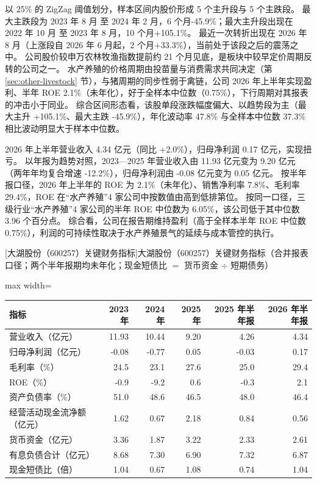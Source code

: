  以 25\% 的 ZigZag 阈值划分，样本区间内股价形成 5 个主升段与 5 个主跌段。 最大主跌段为 2023 年 8 月 至 2024 年 2 月，6 个月-45.9\%；最大主升段出现在 2022 年 10 月 至 2023 年 8 月，10 个月+105.1\%。 最近一次转折出现在 2026 年 8 月（上涨段自 2026 年 6 月起，2 个月+33.3\%），当前处于该段之后的震荡之中。 公司股价较申万农林牧渔指数提前约 21 个月见底，是板块中较早定价周期反转的公司之一。 水产养殖的价格周期由投苗量与消费需求共同决定（第 \ref{sec:other-livestock} 节），与猪周期的同步性弱于禽链，公司 2026 年上半年实现盈利、半年 ROE 2.1\%（未年化），好于全样本中位数（0.75\%），下行周期对其报表的冲击小于同业。 综合区间形态看，该股单段涨跌幅度偏大、以趋势段为主（最大主升 +105.1\%、最大主跌 -45.9\%），年化波动率 47.8\% 与全样本中位数 37.3\% 相比波动明显大于样本中位数。

 2026 年上半年营业收入 4.34 亿元（同比 +2.0\%），归母净利润 0.17 亿元，实现扭亏。 以年报为趋势对照，2023---2025 年营业收入由 11.93 亿元变为 9.20 亿元（两年年均复合增速 -12.2\%），归母净利润由 -0.08 亿元变为 0.05 亿元。 按半年报口径，2026 年上半年的 ROE 为 2.1\%（未年化）、销售净利率 7.8\%、毛利率 29.4\%，ROE 在“水产养殖”4 家公司中按数值由高到低排第位。 按同一口径，三级行业“水产养殖”4 家公司的半年 ROE 中位数为 6.05\%，该公司低于其中位数 3.96 个百分点。 综合看，公司在报告期维持盈利（高于全样本半年 ROE 中位数 0.75\%），利润的可持续性取决于水产养殖景气的延续与成本管控的执行。

\begin{center}\small\setlength{\tabcolsep}{3.4pt}
[大湖股份（600257）关键财务指标]{大湖股份（600257）关键财务指标（合并报表口径；两个半年报期均未年化；现金短债比 $=$ 货币资金 $\div$ 短期债务）}
\begin{adjustbox}{max width=\textwidth}
\begin{tabular}{@{}lrrrrr@{}}
\toprule
指标 & 2023 年 & 2024 年 & 2025 年 & 2025 年半年报 & 2026 年半年报 \\
\midrule
营业收入（亿元） & 11.93 & 10.44 & 9.20 & 4.26 & 4.34 \\
归母净利润（亿元） & -0.08 & -0.77 & 0.05 & -0.03 & 0.17 \\
毛利率（\%） & 24.5 & 23.1 & 27.6 & 25.0 & 29.4 \\
ROE（\%） & -0.9 & -9.2 & 0.6 & -0.3 & 2.1 \\
资产负债率（\%） & 51.0 & 48.6 & 46.5 & 48.0 & 46.4 \\
经营活动现金流净额（亿元） & 1.62 & 0.67 & 2.18 & 0.84 & 0.56 \\
货币资金（亿元） & 3.36 & 1.87 & 3.22 & 2.33 & 2.61 \\
有息负债合计（亿元） & 8.68 & 7.30 & 6.90 & 7.32 & 6.87 \\
现金短债比（倍） & 1.04 & 0.67 & 1.08 & 0.74 & 1.04 \\
\bottomrule
\end{tabular}
\end{adjustbox}
\end{center}


